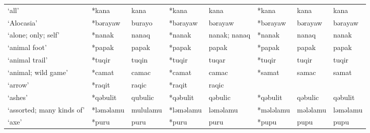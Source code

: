 \begin{landscape}
\begin{longtable}[c]{@{}p{3cm}<{\raggedright}p{2.75cm}<{\raggedright}p{2.75cm}<{\raggedright}p{2.75cm}<{\raggedright}p{2.75cm}<{\raggedright}p{2.75cm}<{\raggedright}p{2.75cm}<{\raggedright}p{2.75cm}<{\raggedright}@{}}
`all'                                                & *kana        & kana                          & *kana          & kana                       & *kana            & kana                     & kana                              \\
`Alocasia'                                           & *bərayaw     & burayo                        & *bərayaw       & bərayaw                    & *bərayaw         & bərayaw                  & bərayaw                           \\
`alone; only; self'                                  & *nanak       & nanaq                         & *nanak         & nanak; nanaq               & *nanak           & nanaq                    & nanak                             \\
`animal foot'                                        & *papak       & papak                         & *papak         & papak                      & *papak           & papak                    & papak                             \\
`animal trail'                                       & *tuqir       & tuqin                         & *tuqir         & tuqar                      & *tuqir           & tuqir                    & tuqir                             \\
`animal; wild game'                                  & *camat       & camac                         & *camat         & camac                      & *samat           & samac                    & samat                             \\
`arrow'                                              & *raqit       & raqic                         & *raqit         & raqic                      &                  &                          &                                   \\
`ashes'                                              & *qəbulit     & qubulic                       & *qəbulit       & qəbulic                    & *qəbulit         & qəbulic                  & qəbulit                           \\
`assorted; many kinds of'                            & *ləməlamu    & mululamu                      & *ləməlamu      & ləməlamu                   & *mələlamu        & mələlamu                 & ləməlamu                          \\
`axe'                                                & *puru        & puru                          & *puru          & puru                       & *pupu            & pupu                     & pupu                              \\

\end{longtable}
\end{landscape}
